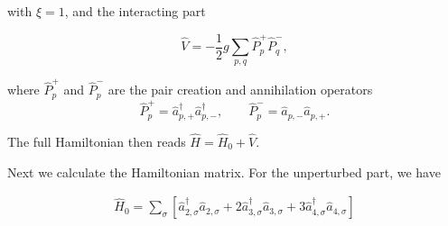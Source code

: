 \documentclass[aps,prl,groupedaddress]{revtex4-1}  %
\begin{document}
with $\xi=1$, and the interacting part

\begin{equation}
\hat V = -\frac{1}{2} g \sum_{p,q} \hat P_p^+ \hat P_q^- ,\label{eq:V}
\end{equation}

where $\hat P_p^+$ and $\hat P_p^-$ are the pair creation and annihilation operators
\begin{equation}
\hat P_p^+ = \hat a_{p,+}^\dagger \hat a_{p,-}^\dagger, \qquad
\hat P_p^- = \hat a_{p,-} \hat a_{p,+} .
\label{eq:P}
\end{equation}

The full Hamiltonian then reads $\hat H = \hat H_0 + \hat V$. 

Next we calculate the Hamiltonian matrix. For the unperturbed part, we have

\begin{align}
\hat H_0 = \sum_{\sigma} \left[ \hat a_{2,\sigma}^\dagger \hat a_{2,\sigma} + 2 \hat a_{3,\sigma}^\dagger \hat a_{3,\sigma} + 3 \hat a_{4,\sigma}^\dagger \hat a_{4,\sigma}  \right]
\end{align}
\end{document}
